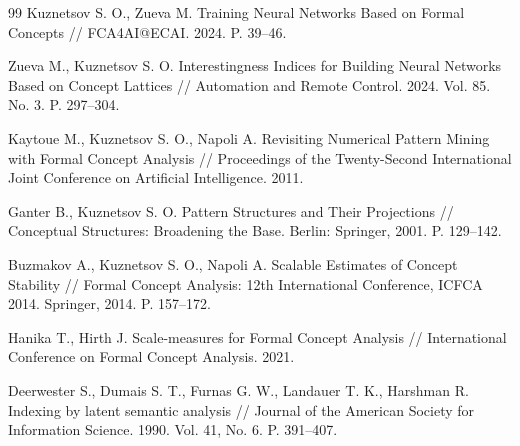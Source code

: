 \documentclass[14pt,a4paper]{extarticle}
\begin{document}
\begin{thebibliography}{99}
Kuznetsov S. O., Zueva M.
Training Neural Networks Based on Formal Concepts //
FCA4AI@ECAI. 2024. P. 39--46.

Zueva M., Kuznetsov S. O.
Interestingness Indices for Building Neural Networks Based on Concept Lattices //
Automation and Remote Control. 2024. Vol. 85. No. 3. P. 297--304.

Kaytoue M., Kuznetsov S. O., Napoli A.
Revisiting Numerical Pattern Mining with Formal Concept Analysis //
Proceedings of the Twenty-Second International Joint Conference on Artificial Intelligence. 2011.

Ganter B., Kuznetsov S. O.
Pattern Structures and Their Projections //
Conceptual Structures: Broadening the Base. Berlin: Springer, 2001.
P. 129--142.

Buzmakov A., Kuznetsov S. O., Napoli A.
Scalable Estimates of Concept Stability //
Formal Concept Analysis: 12th International Conference, ICFCA 2014.
Springer, 2014. P. 157--172.

Hanika T., Hirth J.
Scale-measures for Formal Concept Analysis //
International Conference on Formal Concept Analysis. 2021.

Deerwester S., Dumais S. T., Furnas G. W., Landauer T. K., Harshman R.
Indexing by latent semantic analysis //
Journal of the American Society for Information Science. 1990. Vol. 41, No. 6.
P. 391--407.

\end{thebibliography}
\end{document}

